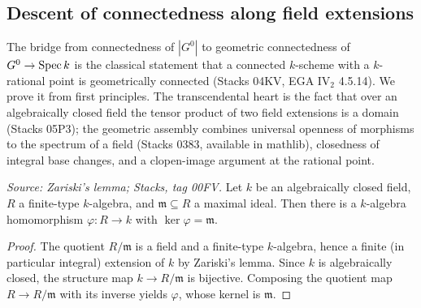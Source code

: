 \subsection{Descent of connectedness along field extensions}
\label{mk-subsec:connectedness_descent}

The bridge from connectedness of \(|G^0|\) to geometric connectedness of
\(G^0 \to \operatorname{Spec} k\) is the classical statement that a connected
\(k\)-scheme with a \(k\)-rational point is geometrically connected
(Stacks 04KV, EGA IV\(_2\) 4.5.14). We prove it from first principles.
The transcendental heart is the fact that over an algebraically closed
field the tensor product of two field extensions is a domain
(Stacks 05P3); the geometric assembly combines universal openness of
morphisms to the spectrum of a field (Stacks 0383, available in
mathlib), closedness of integral base changes, and a clopen-image
argument at the rational point.

\begin{lemma}\label{mk-lem:maximal_ideal_evaluation_alg_closed}
  \leanok

  \textit{Source: Zariski's lemma; Stacks, tag 00FV.}
  Let \(k\) be an algebraically closed field, \(R\) a finite-type
  \(k\)-algebra, and \(\mathfrak m \subseteq R\) a maximal ideal. Then
  there is a \(k\)-algebra homomorphism \(\varphi : R \to k\) with
  \(\ker \varphi = \mathfrak m\).
\end{lemma}
\begin{proof}
  \leanok
  The quotient \(R/\mathfrak m\) is a field and a finite-type
  \(k\)-algebra, hence a finite (in particular integral) extension of
  \(k\) by Zariski's lemma. Since \(k\) is algebraically closed, the
  structure map \(k \to R/\mathfrak m\) is bijective. Composing the
  quotient map \(R \to R/\mathfrak m\) with its inverse yields
  \(\varphi\), whose kernel is \(\mathfrak m\).
\end{proof}

